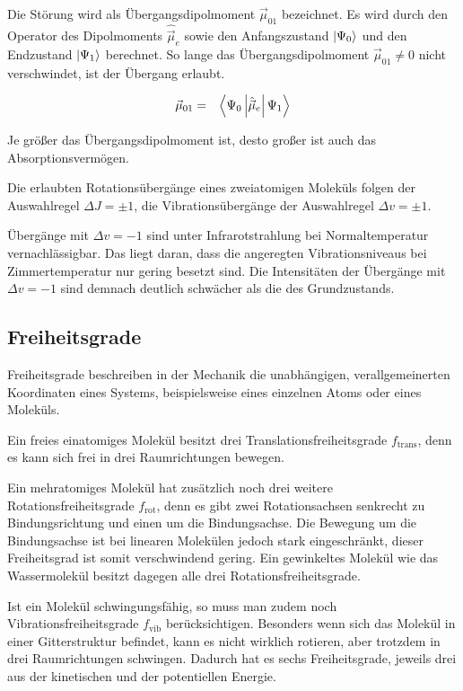 \documentclass[12pt,a4paper]{scrartcl}
\numberwithin{equation}{section} %
\begin{document}
Die Störung wird als Übergangsdipolmoment $\vec\mu_{01}$ bezeichnet. Es wird durch den Operator des Dipolmoments $\hat {\vec \mu}_e$ sowie den Anfangszustand $\ket{\Psi_0}$ und den Endzustand $\ket{\Psi_1}$ berechnet. So lange das Übergangsdipolmoment $\vec\mu_{01}\neq0$ nicht verschwindet, ist der Übergang erlaubt.

\begin{eqnarray}
	\vec \mu_{01} &=& \expval{\Psi_0\left|\hat {\vec \mu}_e\right|\Psi_1}
\end{eqnarray}

\noindent
Je größer das Übergangsdipolmoment ist, desto großer ist auch das Absorptionsvermögen.

Die erlaubten Rotationsübergänge eines zweiatomigen Moleküls folgen der Auswahlregel $\Delta J = \pm 1$, die Vibrationsübergänge der Auswahlregel $\Delta v = \pm 1$.

Übergänge mit $\Delta v = -1$ sind unter Infrarotstrahlung bei Normaltemperatur vernachlässigbar. Das liegt daran, dass die angeregten Vibrationsniveaus bei Zimmertemperatur nur gering besetzt sind. Die Intensitäten der Übergänge mit $\Delta v = -1$ sind demnach deutlich schwächer als die des Grundzustands.

\hypertarget{freiheitsgrade}{%
\subsection{Freiheitsgrade}\label{freiheitsgrade}}

Freiheitsgrade beschreiben in der Mechanik die unabhängigen, verallgemeinerten Koordinaten eines Systems, beispielsweise eines einzelnen Atoms oder eines Moleküls.

Ein freies einatomiges Molekül besitzt drei Translationsfreiheitsgrade $f_\mathrm{trans}$, denn es kann sich frei in drei Raumrichtungen bewegen. \cite{Gerthsen}

Ein mehratomiges Molekül hat zusätzlich noch drei weitere Rotationsfreiheitsgrade $f_\mathrm{rot}$, denn es gibt zwei Rotationsachsen senkrecht zu Bindungsrichtung und einen um die Bindungsachse. Die Bewegung um die Bindungsachse ist bei linearen Molekülen jedoch stark eingeschränkt, dieser Freiheitsgrad ist somit verschwindend gering. \cite{Freiheitsgrad} Ein gewinkeltes Molekül wie das Wassermolekül besitzt dagegen alle drei Rotationsfreiheitsgrade. \cite{Gerthsen}

Ist ein Molekül schwingungsfähig, so muss man zudem noch Vibrationsfreiheitsgrade $f_\mathrm{vib}$ berücksichtigen. Besonders wenn sich das Molekül in einer Gitterstruktur befindet, kann es nicht wirklich rotieren, aber trotzdem in drei Raumrichtungen schwingen. Dadurch hat es sechs Freiheitsgrade, jeweils drei aus der kinetischen und der potentiellen Energie.
\end{document}

